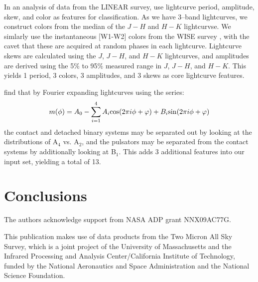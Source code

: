 \documentclass[]{emulateapj}
\begin{document}
In an analysis of data from the LINEAR survey, \cite{LINEAR-3} use
lightcurve period, amplitude, skew, and color as features for
classification.  As we have 3--band lightcurves, we construct colors
from the median of the $J-H$ and $H-K$ lightcurvse.  We simlarly use
the instantaneous [W1-W2] colors from the WISE survey \cite{wise},
with the cavet that these are acquired at random phases in each
lightcurve.  Lightcurve skews are calculated using the $J$, $J-H$, and
$H-K$ lightcurves, and amplitudes are derived using the 5\% to 95\%
measured range in $J$, $J-H$, and $H-K$.  This yields 1 period, 3
colors, 3 amplitudes, and 3 skews as core lightcurve features.

\cite{asas} find that by Fourier expanding lightcurves using the
series:
\[m(\phi) = A_0 - \sum_{i=1}^4 A_i {\rm cos}(2 \pi i \phi + \varphi) + B_i {\rm sin}(2 \pi i \phi + \varphi)\]
the contact and detached binary systems may be separated out by
looking at the distributions of A$_4$ vs. A$_2$, and the pulsators may
be separated from the contact systems by additionally looking at
B$_1$.  This adds 3 additional features into our input set, yielding a
total of 13.


\section{Conclusions}



\acknowledgements
The authors acknowledge support from NASA ADP grant NNX09AC77G.

This publication makes use of data products from the Two Micron All Sky Survey, which is a joint project of the University of Massachusetts and the Infrared Processing and Analysis Center/California Institute of Technology, funded by the National Aeronautics and Space Administration and the National Science Foundation.






\end{document}
